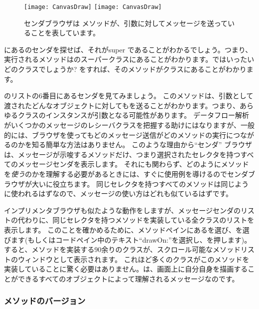 \documentclass[a4paper,10pt,twoside]{book}
\begin{document}
\begin{figure}[htbp]
\begin{center}
   \ifluluelse
{\texttt{[image: CanvasDraw]}}
{\texttt{[image: CanvasDraw]}}
\end{center}
\caption{センダブラウザは メソッドが、引数に対してメッセージを送っていることを表しています。}
\end{figure}

にあるのセンダを探せば、それがsuper であることがわかるでしょう。つまり、実行されるメソッドはのスーパークラスにあることがわかります。ではいったいどのクラスでしょうか? を\actclick すれば、そのメソッドがクラスにあることがわかります。

のリストの6番目にあるセンダを見てみましょう。
このメソッドは、引数として渡されたどんなオブジェクトに対してもを送ることがわかります。つまり、あらゆるクラスのインスタンスが引数となる可能性があります。
データフロー解析がいくつかのメッセージのレシーバクラスを把握する助けにはなりますが、一般的には、ブラウザを使ってもどのメッセージ送信がどのメソッドの実行につながるのかを知る簡単な方法はありません。
このような理由から``センダ'' ブラウザは、メッセージが示唆するメソッドだけ、つまり選択されたセレクタを持つすべてのメッセージセンダを表示します。
それにも関わらず、どのようにメソッドを\emph{使う}のかを理解する必要があるときには、すぐに使用例を導けるのでセンダブラウザが大いに役立ちます。
同じセレクタを持つすべてのメソッドは同じように使われるはずなので、メッセージの使い方はどれも似ているはずです。

インプリメンタブラウザも似たような動作をしますが、メッセージセンダのリストの代わりに、同じセレクタを持つメソッドを実装している全クラスのリストを表示します。
このことを確かめるために、メソッドペインにあるを選び、を選びます(もしくはコードペイン中のテキスト``drawOn:''を選択し、を押します)。すると、メソッドを実装する90余りのクラスが、スクロール可能なメソッドリストのウィンドウとして表示されます。
これほど多くのクラスがこのメソッドを実装していることに驚く必要はありません。は、画面上に自分自身を描画することができるすべてのオブジェクトによって理解されるメッセージなのです。

\subsubsection{メソッドのバージョン}
\end{document}
